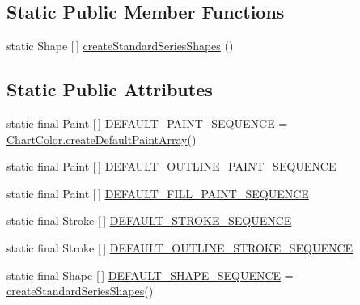 \subsection*{Static Public Member Functions}
\begin{DoxyCompactItemize}
\item 
static Shape \mbox{[}$\,$\mbox{]} \mbox{\hyperlink{classorg_1_1jfree_1_1chart_1_1plot_1_1_default_drawing_supplier_acea88e7c31a41a5952a45b556a6a044d}{create\+Standard\+Series\+Shapes}} ()
\end{DoxyCompactItemize}
\subsection*{Static Public Attributes}
\begin{DoxyCompactItemize}
\item 
static final Paint \mbox{[}$\,$\mbox{]} \mbox{\hyperlink{classorg_1_1jfree_1_1chart_1_1plot_1_1_default_drawing_supplier_af6c2299d3eb859e5fa4f8569435e7a8e}{D\+E\+F\+A\+U\+L\+T\+\_\+\+P\+A\+I\+N\+T\+\_\+\+S\+E\+Q\+U\+E\+N\+CE}} = \mbox{\hyperlink{classorg_1_1jfree_1_1chart_1_1_chart_color_af436c491352218d70ac2fba2583ab32c}{Chart\+Color.\+create\+Default\+Paint\+Array}}()
\item 
static final Paint \mbox{[}$\,$\mbox{]} \mbox{\hyperlink{classorg_1_1jfree_1_1chart_1_1plot_1_1_default_drawing_supplier_ad50ac2236d1f7188c5c9b76cc806759d}{D\+E\+F\+A\+U\+L\+T\+\_\+\+O\+U\+T\+L\+I\+N\+E\+\_\+\+P\+A\+I\+N\+T\+\_\+\+S\+E\+Q\+U\+E\+N\+CE}}
\item 
static final Paint \mbox{[}$\,$\mbox{]} \mbox{\hyperlink{classorg_1_1jfree_1_1chart_1_1plot_1_1_default_drawing_supplier_a9cfb60c38612515c676c5a2759091fbe}{D\+E\+F\+A\+U\+L\+T\+\_\+\+F\+I\+L\+L\+\_\+\+P\+A\+I\+N\+T\+\_\+\+S\+E\+Q\+U\+E\+N\+CE}}
\item 
static final Stroke \mbox{[}$\,$\mbox{]} \mbox{\hyperlink{classorg_1_1jfree_1_1chart_1_1plot_1_1_default_drawing_supplier_a2da2e0406e07ddca67bec158584a1a74}{D\+E\+F\+A\+U\+L\+T\+\_\+\+S\+T\+R\+O\+K\+E\+\_\+\+S\+E\+Q\+U\+E\+N\+CE}}
\item 
static final Stroke \mbox{[}$\,$\mbox{]} \mbox{\hyperlink{classorg_1_1jfree_1_1chart_1_1plot_1_1_default_drawing_supplier_abc50275521eefeef464be71618228b38}{D\+E\+F\+A\+U\+L\+T\+\_\+\+O\+U\+T\+L\+I\+N\+E\+\_\+\+S\+T\+R\+O\+K\+E\+\_\+\+S\+E\+Q\+U\+E\+N\+CE}}
\item 
static final Shape \mbox{[}$\,$\mbox{]} \mbox{\hyperlink{classorg_1_1jfree_1_1chart_1_1plot_1_1_default_drawing_supplier_a6040398a9c61e57466cda47459d7eadb}{D\+E\+F\+A\+U\+L\+T\+\_\+\+S\+H\+A\+P\+E\+\_\+\+S\+E\+Q\+U\+E\+N\+CE}} = \mbox{\hyperlink{classorg_1_1jfree_1_1chart_1_1plot_1_1_default_drawing_supplier_acea88e7c31a41a5952a45b556a6a044d}{create\+Standard\+Series\+Shapes}}()
\end{DoxyCompactItemize}


